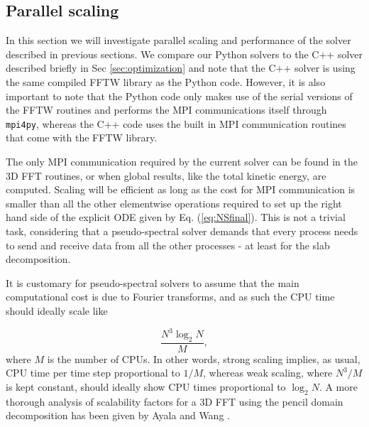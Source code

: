 \documentclass[11pt, oneside]{article}
\newcommand{\inpyth}{\lstinline[keywordstyle={}, basicstyle=\ttfamily]} %[]%
\begin{document}
\subsection{Parallel scaling}
In this section we will investigate parallel scaling and performance of the solver described in previous sections. We compare our Python solvers to the C++ solver described briefly in Sec \ref{sec:optimization} and note that the C++ solver is using the same compiled FFTW library as the Python code. However, it is also important to note that the Python code only makes use of the serial versions of the FFTW routines and performs the MPI communications itself through
\inpyth{mpi4py}, whereas the C++ code uses the built in MPI communication routines that come with the FFTW library.

The only MPI communication required by the current solver can be found in the 3D
FFT routines, or when global results, like the total kinetic energy, are
computed. Scaling will be efficient as long as the cost for MPI
communication is smaller than all the other elementwise operations required
to set up the right hand side of the explicit ODE given by Eq.
(\ref{eq:NSfinal}). This is not a trivial task, considering that a pseudo-spectral solver demands that every process needs to send and receive data
from all the other processes - at least for the slab decomposition.

It is customary for pseudo-spectral solvers to assume that the main computational cost is due to Fourier transforms, and as such the CPU time should ideally scale like

\begin{equation}
 \frac{N^3 \log_2 N}{M},
\end{equation}
where $M$ is the number of CPUs. In other words, strong scaling implies, as usual, CPU time per time step proportional to $1/M$, whereas weak scaling, where $N^3/M$ is kept constant, should ideally show CPU times proportional to $\log_2 N$. A more thorough analysis of scalability factors for a 3D FFT using the pencil domain decomposition has been given by Ayala and Wang \cite{ayala2013}.
\end{document}
